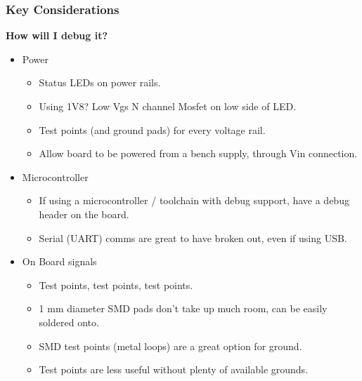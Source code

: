 \documentclass[t]{beamer}
\begin{document}
\begin{frame}
\frametitle{Key Considerations}
\large{\textbf{How will I debug it?}}
\vspace{1mm}
\begin{itemize}
	\item Power
	\begin{itemize}
		\item Status LEDs on power rails.
		\item Using 1V8? Low Vgs N channel Mosfet on low side of LED. 
		\item Test points (and ground pads) for every voltage rail.
		\item Allow board to be powered from a bench supply, through Vin connection.
	\end{itemize}
	\item Microcontroller
	\begin{itemize}
		\item If using a microcontroller / toolchain with debug support, have a debug header on the board. 
		\item Serial (UART) comms are great to have broken out, even if using USB. 
	\end{itemize}
	\item On Board signals
	\begin{itemize}
		\item Test points, test points, test points.
		\item 1 mm diameter SMD pads don't take up much room, can be easily soldered onto. 
		\item SMD test points (metal loops) are a great option for ground. 
		\item Test points are less useful without plenty of available grounds.
	\end{itemize}
\end{itemize}
\end{frame}

\end{document}
